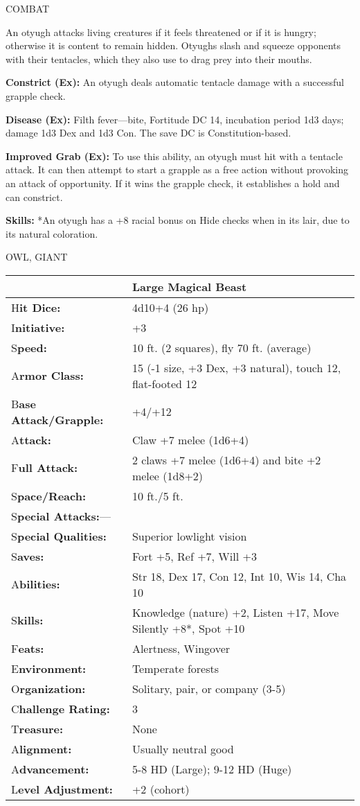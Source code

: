 \documentclass{article}
\begin{document}
COMBAT

An otyugh attacks living creatures if it feels threatened or if it is hungry; otherwise 
it is content to remain hidden. Otyughs slash and squeeze opponents with their 
tentacles, which they also use to drag prey into their mouths.

\textbf{Constrict (Ex):} An otyugh deals automatic tentacle damage with a successful 
grapple check.

\textbf{Disease (Ex):} Filth fever---bite, Fortitude DC 14, incubation period 1d3 
days; damage 1d3 Dex and 1d3 Con. The save DC is Constitution-based.

\textbf{Improved Grab (Ex):} To use this ability, an otyugh must hit with a tentacle 
attack. It can then attempt to start a grapple as a free action without provoking 
an attack of opportunity. If it wins the grapple check, it establishes a hold and 
can constrict.

\textbf{Skills: }*An otyugh has a +8 racial bonus on Hide checks when in its lair, 
due to its natural coloration.

\vspace{12pt}
{\LARGE{}OWL, GIANT}

\begin{tabular}{|>{\raggedright}p{85pt}|>{\raggedright}p{241pt}|}
\hline
  & Large Magical Beast\tabularnewline
\hline
H\textbf{it Dice:} & 4d10+4 (26 hp)\tabularnewline
\hline
I\textbf{nitiative:} & +3\tabularnewline
\hline
S\textbf{peed:} & 10 ft. (2 squares), fly 70 ft. (average)\tabularnewline
\hline
A\textbf{rmor Class:} & 15 (-1 size, +3 Dex, +3 natural), touch 12, flat-footed 
12\tabularnewline
\hline
B\textbf{ase Attack/Grapple:} & +4/+12\tabularnewline
\hline
A\textbf{ttack:} & Claw +7 melee (1d6+4)\tabularnewline
\hline
F\textbf{ull Attack:} & 2 claws +7 melee (1d6+4) and bite +2 melee (1d8+2)\tabularnewline
\hline
S\textbf{pace/Reach:} & 10 ft./5 ft.\tabularnewline
\hline
S\textbf{pecial Attacks:}--- & \tabularnewline
\hline
S\textbf{pecial Qualities:} & Superior lowlight vision\tabularnewline
\hline
S\textbf{aves:} & Fort +5, Ref +7, Will +3\tabularnewline
\hline
A\textbf{bilities:} & Str 18, Dex 17, Con 12, Int 10, Wis 14, Cha 10\tabularnewline
\hline
S\textbf{kills:} & Knowledge (nature) +2, Listen +17, Move Silently +8*, Spot +10 
\tabularnewline
\hline
F\textbf{eats:} & Alertness, Wingover\tabularnewline
\hline
E\textbf{nvironment:} & Temperate forests\tabularnewline
\hline
O\textbf{rganization:} & Solitary, pair, or company (3-5)\tabularnewline
\hline
C\textbf{hallenge Rating:} & 3\tabularnewline
\hline
T\textbf{reasure:} & None\tabularnewline
\hline
A\textbf{lignment:} & Usually neutral good\tabularnewline
\hline
A\textbf{dvancement:} & 5-8 HD (Large); 9-12 HD (Huge)\tabularnewline
\hline
L\textbf{evel Adjustment:} & +2 (cohort)\tabularnewline
\hline
\end{tabular}
\end{document}
